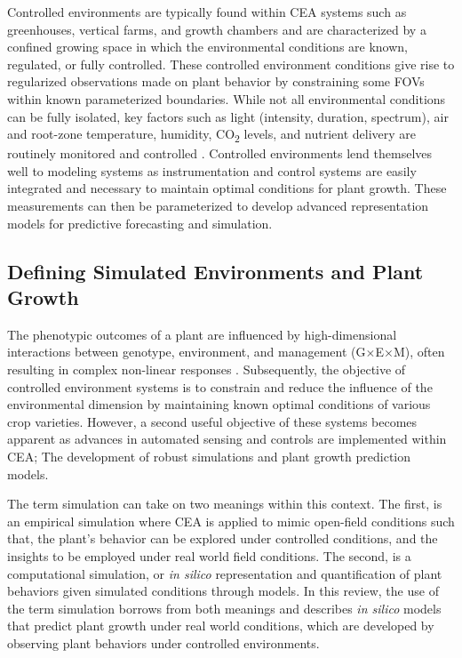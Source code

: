 \documentclass{article}
\begin{document}
Controlled environments are typically found within CEA systems such as greenhouses, vertical farms, and growth chambers and are characterized by a confined growing space in which the environmental conditions are known, regulated, or fully controlled. 
These controlled environment conditions give rise to regularized observations made on plant behavior by constraining some FOVs within known parameterized boundaries.  
While not all environmental conditions can be fully isolated, key factors such as light (intensity, duration, spectrum), air and root-zone temperature, humidity, CO\textsubscript{2} levels, and nutrient delivery are routinely monitored and controlled \cite{srivani2019controlled}.
Controlled environments lend themselves well to modeling systems as instrumentation and control systems are easily integrated and necessary to maintain optimal conditions for plant growth. 
These measurements can then be parameterized to develop advanced representation models for predictive forecasting and simulation.

    

\subsection{Defining Simulated Environments and Plant Growth}
The phenotypic outcomes of a plant are influenced by high-dimensional interactions between genotype, environment, and management (G$\times$E$\times$M), often resulting in complex non-linear responses \cite{cooper2022predicting,MESSINA2018151,mahmood2022genotype}. 
Subsequently, the objective of controlled environment systems is to constrain and reduce the influence of the environmental dimension by maintaining known optimal conditions of various crop varieties. 
However, a second useful objective of these systems becomes apparent as advances in automated sensing and controls are implemented within CEA; The development of robust simulations and plant growth prediction models.

The term simulation can take on two meanings within this context. 
The first, is an empirical simulation where CEA is applied to mimic open-field conditions such that, the plant's behavior can be explored under controlled conditions, and the insights to be employed under real world field conditions.  
The second, is a computational simulation, or \textit{in silico} representation and quantification of plant behaviors given simulated conditions through models. 
In this review, the use of the term simulation borrows from both meanings and describes \textit{in silico} models that predict plant growth under real world conditions, which are developed by observing plant behaviors under controlled environments.
\end{document}
